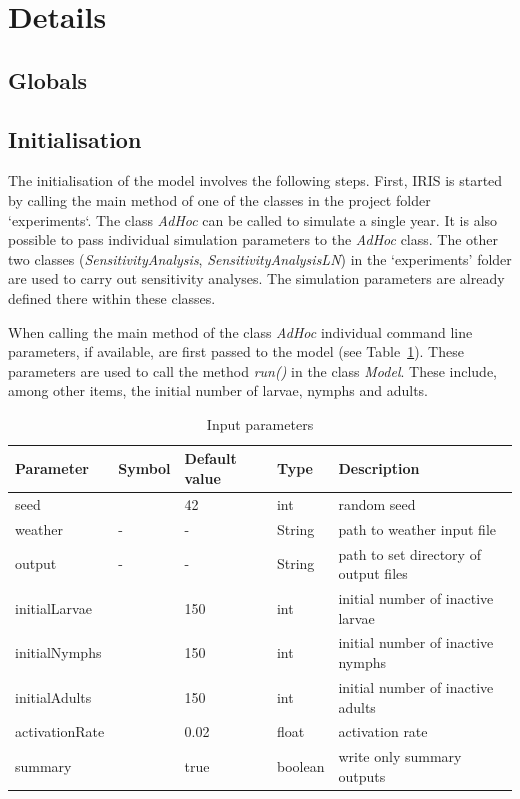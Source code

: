 \documentclass[a4paper, 11pt]{scrartcl}
\begin{document}
\newpage


\section{Details}

\subsection{Globals}

\subsection{Initialisation}\label{initialisation}
The initialisation of the model involves the following steps. First, IRIS is started by calling the main method of one of the classes in the project folder `experiments`. The class \textit{AdHoc} can be called to simulate a single year. It is also possible to pass individual simulation parameters to the \textit{AdHoc} class. The other two classes (\textit{SensitivityAnalysis}, \textit{SensitivityAnalysisLN}) in the `experiments' folder are used to carry out sensitivity analyses. The simulation parameters are already defined there within these classes.

When calling the main method of the class \textit{AdHoc} individual command line parameters, if available, are first passed to the model (see Table~\ref{tab:initialisation_parameters}). These parameters are used to call the method \textit{run()} in the class \textit{Model}. These include, among other items, the initial number of larvae, nymphs and adults.

\begin{table}[h!]
\caption{Input parameters}
\label{tab:initialisation_parameters}
\begin{tabularx}{\textwidth}{lllll}
\toprule
\textbf{Parameter} 	& \textbf{Symbol} & \textbf{Default value} & \textbf{Type} & \textbf{Description} \\
\midrule
seed    			&   & 42    & int     & random seed \\
weather     		& - & -     & String  & path to weather input file \\
output     			& - & -     & String  & path to set directory of output files \\
initialLarvae       &   & 150   & int     & initial number of inactive larvae \\
initialNymphs       &   & 150   & int     & initial number of inactive nymphs \\
initialAdults       &   & 150   & int     & initial number of inactive adults \\
activationRate      &   & 0.02  & float   & activation rate  \\
summary       		&   & true & boolean & write only summary outputs \\
\bottomrule
\end{tabularx}
\end{table}
\end{document}
